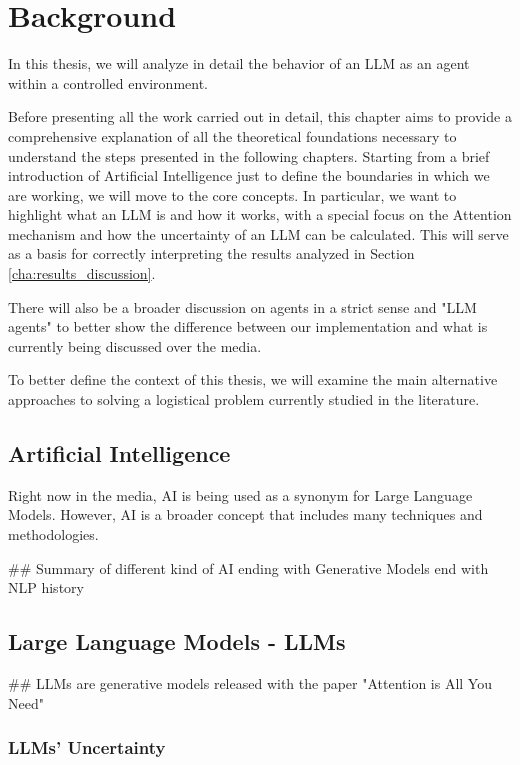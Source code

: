 \chapter{Background}
\label{cha:background}

In this thesis, we will analyze in detail the behavior of an LLM as an agent within
a controlled environment.

Before presenting all the work carried out in detail, this chapter aims to
provide a comprehensive explanation of all the theoretical foundations necessary
to understand the steps presented in the following chapters. Starting from a brief
introduction of Artificial Intelligence just to define the boundaries in which we
are working, we will move to the core concepts. In particular, we want to
highlight what an LLM is and how it works, with a special focus on the Attention
mechanism and how the uncertainty of an LLM can be calculated. This will serve
as a basis for correctly interpreting the results analyzed in Section
\ref{cha:results_discussion}.

There will also be a broader discussion on agents in a strict sense and "LLM agents"
to better show the difference between our implementation and what is currently
being discussed over the media.

To better define the context of this thesis, we will examine the main alternative
approaches to solving a logistical problem currently studied in the literature.

\section{Artificial Intelligence}
\label{sec:artificial_intelligence}

Right now in the media, AI is being used as a synonym for Large Language Models.
However, AI is a broader concept that includes many techniques and methodologies.

\#\# Summary of different kind of AI ending with Generative Models end with NLP
history

\section{Large Language Models - LLMs}
\label{sec:large_language_models_llms}

\#\# LLMs are generative models released with the paper "Attention is All You
Need"

\subsection{LLMs' Uncertainty}
\label{sub:llms_uncertainty}

